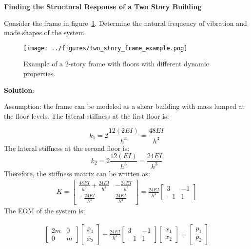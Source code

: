 \documentclass[12pt,letter]{article}
\begin{document}
\begin{example}
\textbf{Finding the Structural Response of a Two Story Building}

\noindent Consider the frame in figure~\ref{fig:two_story_frame_ex}. Determine the natural frequency of vibration and mode shapes of the system.
\begin{figure}[H]
	\centering
	\texttt{[image: ../figures/two\_story\_frame\_example.png]}
	\caption{Example of a 2-story frame with floors with different dynamic properties.}
	\label{fig:two_story_frame_ex}
\end{figure}

\noindent \textbf{Solution}:

\vspace{1ex}
	
\noindent Assumption: the frame can be modeled as a shear building with mass lumped at the floor levels. The lateral stiffness at the first floor is:

\begin{equation}
k_1 = 2 \frac{12(2EI)}{h^3} = \frac{48EI}{h^3}
\end{equation}
The lateral stiffness at the second floor is:
\begin{equation}
k_2 = 2 \frac{12(EI)}{h^3} = \frac{24EI}{h^3}
\end{equation}
Therefore, the stiffness matrix can be written as:
\begin{eqnarray}
K= \begin{bmatrix} \frac{48EI}{h^3} + \frac{24EI}{h^3} & -\frac{24EI}{h^3}  \\  -\frac{24EI}{h^3} & \frac{24EI}{h^3} \end{bmatrix} = \frac{24EI}{h^3} \begin{bmatrix} 3 & -1  \\  -1 & 1 \end{bmatrix}
\end{eqnarray}		
The EOM of the system is:

\begin{eqnarray} 
\begin{bmatrix} 2m & 0  \\  0 & m \end{bmatrix}\begin{bmatrix} \ddot{x_1} \\  \ddot{x_2} \end{bmatrix} + \frac{24EI}{h^3} \begin{bmatrix} 3 & -1  \\  -1 & 1 \end{bmatrix}\begin{bmatrix} x_1 \\  x_2 \end{bmatrix}  = \begin{bmatrix} p_1 \\  p_2 \end{bmatrix}
\end{eqnarray}


\end{example}
\end{document}
